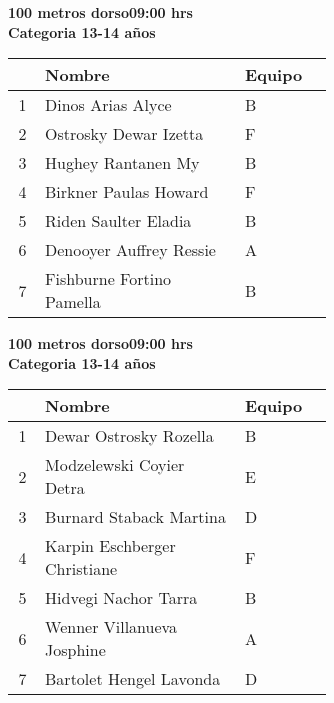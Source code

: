 \begin{minipage}{0.95\linewidth}\vspace{0.5cm} 
\begin{flushleft}
\textbf{
\hspace{-0.15cm}100 metros dorso\hspace{1.5cm}09:00 hrs \\Categoria 13-14 años}\vspace{-0.2cm} 
\end{flushleft}
\begin{tabular}{cp{0.63\linewidth}l}
\hline
& \textbf{Nombre} & \textbf{Equipo} \\ \hline
1 & Dinos Arias Alyce & B \\ 
2 & Ostrosky Dewar Izetta & F \\ 
3 & Hughey Rantanen My & B \\ 
4 & Birkner Paulas Howard & F \\ 
5 & Riden Saulter Eladia & B \\ 
6 & Denooyer Auffrey Ressie & A \\ 
7 & Fishburne Fortino Pamella & B \\ 
\end{tabular}
\end{minipage}
\begin{minipage}{0.95\linewidth}\vspace{0.5cm} 
\begin{flushleft}
\textbf{
\hspace{-0.15cm}100 metros dorso\hspace{1.5cm}09:00 hrs \\Categoria 13-14 años}\vspace{-0.2cm} 
\end{flushleft}
\begin{tabular}{cp{0.63\linewidth}l}
\hline
& \textbf{Nombre} & \textbf{Equipo} \\ \hline
1 & Dewar Ostrosky Rozella & B \\ 
2 & Modzelewski Coyier Detra & E \\ 
3 & Burnard Staback Martina & D \\ 
4 & Karpin Eschberger Christiane & F \\ 
5 & Hidvegi Nachor Tarra & B \\ 
6 & Wenner Villanueva Josphine & A \\ 
7 & Bartolet Hengel Lavonda & D \\ 
\end{tabular}
\end{minipage}
